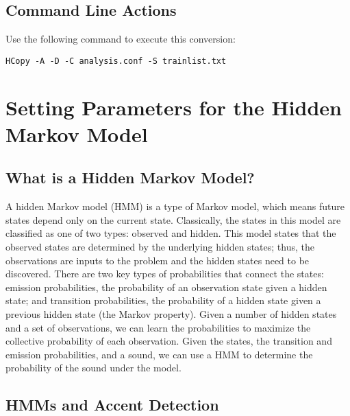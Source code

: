\documentclass{wileySev}
\begin{document}
\section{Command Line Actions}
Use the following command to execute this conversion:
\begin{verbatim}
HCopy -A -D -C analysis.conf -S trainlist.txt
\end{verbatim}

\chapter{Setting Parameters for the Hidden Markov Model}

\section{What is a Hidden Markov Model?}
A hidden Markov model (HMM) is a type of Markov model, which means future states depend only on the current state. Classically, the states in this model are classified as one of two types: observed and hidden. This model states that the observed states are determined by the underlying hidden states; thus, the observations are inputs to the problem and the hidden states need to be discovered. There are two key types of probabilities that connect the states: emission probabilities, the probability of an observation state given a hidden state; and transition probabilities, the probability of a hidden state given a previous hidden state (the Markov property). Given a number of hidden states and a set of observations, we can learn the probabilities to maximize the collective probability of each observation. Given the states, the transition and emission probabilities, and a sound, we can use a HMM to determine the probability of the sound under the model.

\section{HMMs and Accent Detection}
\end{document}
